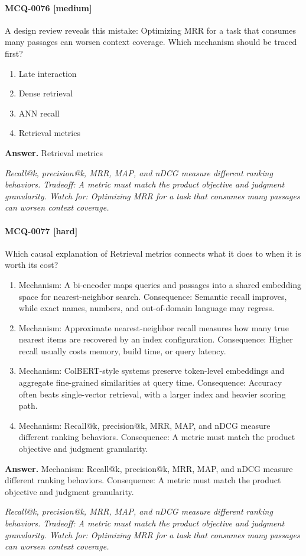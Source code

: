 \paragraph{MCQ-0076 [medium]} A design review reveals this mistake: Optimizing MRR for a task that consumes many passages can worsen context coverage. Which mechanism should be traced first?
\begin{enumerate}[label=\Alph*.]
\item Late interaction
\item Dense retrieval
\item ANN recall
\item Retrieval metrics
\end{enumerate}
\noindent\textbf{Answer.} Retrieval metrics
\par\textit{Recall@k, precision@k, MRR, MAP, and nDCG measure different ranking behaviors. Tradeoff: A metric must match the product objective and judgment granularity. Watch for: Optimizing MRR for a task that consumes many passages can worsen context coverage.}
\paragraph{MCQ-0077 [hard]} Which causal explanation of Retrieval metrics connects what it does to when it is worth its cost?
\begin{enumerate}[label=\Alph*.]
\item Mechanism: A bi-encoder maps queries and passages into a shared embedding space for nearest-neighbor search. Consequence: Semantic recall improves, while exact names, numbers, and out-of-domain language may regress.
\item Mechanism: Approximate nearest-neighbor recall measures how many true nearest items are recovered by an index configuration. Consequence: Higher recall usually costs memory, build time, or query latency.
\item Mechanism: ColBERT-style systems preserve token-level embeddings and aggregate fine-grained similarities at query time. Consequence: Accuracy often beats single-vector retrieval, with a larger index and heavier scoring path.
\item Mechanism: Recall@k, precision@k, MRR, MAP, and nDCG measure different ranking behaviors. Consequence: A metric must match the product objective and judgment granularity.
\end{enumerate}
\noindent\textbf{Answer.} Mechanism: Recall@k, precision@k, MRR, MAP, and nDCG measure different ranking behaviors. Consequence: A metric must match the product objective and judgment granularity.
\par\textit{Recall@k, precision@k, MRR, MAP, and nDCG measure different ranking behaviors. Tradeoff: A metric must match the product objective and judgment granularity. Watch for: Optimizing MRR for a task that consumes many passages can worsen context coverage.}
